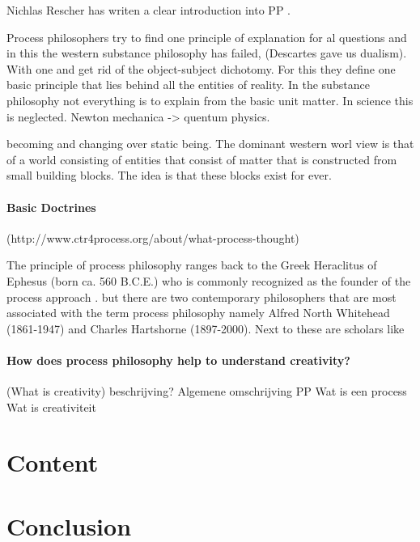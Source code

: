 Nichlas Rescher has writen a clear introduction into PP \cite{rescher1996process}.

Process philosophers try to find one principle of explanation for al questions and in this the western  substance philosophy has failed, (Descartes gave us dualism).
With one and get rid of the object-subject dichotomy. For this they define one basic principle that lies behind all the entities of reality. 
In the substance philosophy not everything is to explain from the basic unit matter. In science this is neglected.
Newton mechanica -> quentum physics.

becoming and changing over static being. The dominant western worl view is that of a world consisting of entities that consist of matter that is constructed from small building blocks. The idea is that these blocks exist for ever.

\paragraph{Basic Doctrines}

(http://www.ctr4process.org/about/what-process-thought)

The principle of process philosophy ranges back to the Greek Heraclitus of Ephesus (born ca. 560 B.C.E.) who is commonly recognized as the founder of the process approach \cite{Seibt-2013-sep}. 
but there are two contemporary philosophers that are most associated with the term process philosophy namely Alfred North Whitehead (1861-1947) and Charles Hartshorne (1897-2000).
Next to these are scholars like





\paragraph{How does process philosophy help to understand creativity?}


\paragragph(What is creativity)
beschrijving?
Algemene omschrijving PP
Wat is een process
Wat is creativiteit


\section{Content}
\section{Conclusion}
